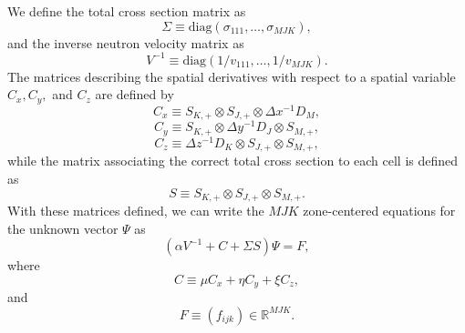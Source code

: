 We define the total cross section matrix as
\begin{equation}
	\Sigma \equiv \text{diag}(\sigma_{111}, \dots, \sigma_{MJK}),
\end{equation}
and the inverse neutron velocity matrix as 
\begin{equation}
	V^{-1} \equiv \text{diag}(1/v_{111}, \dots, 1/v_{MJK}).
\end{equation}
The matrices describing the spatial derivatives with respect to a spatial variable $C_{x}, C_{y},$ and $C_{z}$ are defined by
\begin{equation}
	C_{x} \equiv S_{K,+} \otimes S_{J,+} \otimes \Delta x^{-1} D_{M},
\end{equation}
\begin{equation}
	C_{y} \equiv S_{K,+} \otimes \Delta y^{-1} D_{J} \otimes S_{M,+},
\end{equation}
\begin{equation}
	C_{z} \equiv \Delta z^{-1} D_{K} \otimes S_{J,+} \otimes S_{M,+},
\end{equation}
while the matrix associating the correct total cross section to each cell is defined as
\begin{equation}
	S \equiv S_{K,+} \otimes S_{J,+} \otimes S_{M,+}.
\end{equation}
With these matrices defined, we can write the $MJK$ zone-centered equations for the unknown vector $\Psi$ as
\begin{equation}
	(\alpha V^{-1} + C + \Sigma S) \Psi = F,
	\label{eq:Disc}
\end{equation}
where
\begin{equation}
	C \equiv \mu C_{x} + \eta C_{y} + \xi C_{z},
\end{equation}
and 
\begin{equation}
F \equiv (f_{ijk}) \in \mathbb{R}^{MJK}.
\end{equation}

